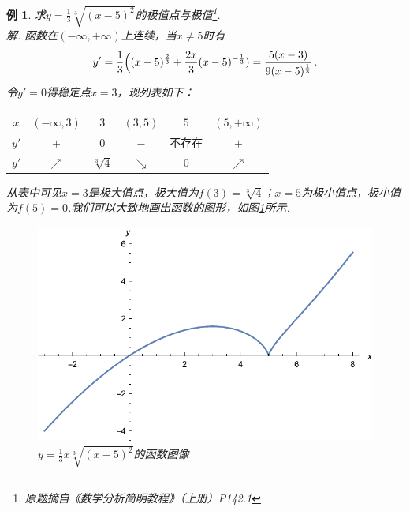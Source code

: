 \documentclass[UTF8,11pt]{ctexart}
\newtheorem{example}{例}
\begin{document}
		\begin{example}
			求$y=\frac{1}{3}\sqrt[3]{(x-5)^2}$的极值点与极值\footnote{原题摘自《数学分析简明教程》（上册）P142.1}.\\
			解. 函数在$(-\infty,+\infty)$上连续，当$x\not=5$时有
			\vspace{-4ex}
			\begin{equation}
			\vspace{-4ex}
				y'=\frac{1}{3}\Big((x-5)^\frac{2}{3} + \frac{2x}{3}(x-5)^{-\frac{1}{3}})=\frac{5(x-3)}{9(x-5)^\frac{1}{3}}\,.
			\end{equation}
			令$y'=0$得稳定点$x=3$，现列表如下：

			\begin{table}[H]
			\begin{center}
			\begin{tabular}{|c|c|c|c|c|c|}\hline
				$x$ & $(-\infty,3)$ & $3$ & $(3,5)$ & $5$ & $(5,+\infty)$\\\hline
				$y'$ & $+$ & $0$ & $-$ & $不存在$ & $+$\\\hline
				$y'$ & $\nearrow$ & $\sqrt[3]{4}$ & $\searrow$ & $0$ & $\nearrow$\\\hline
			\end{tabular}
			\end{center}
			\end{table}
			\vspace{-4ex}

			从表中可见$x=3$是极大值点，极大值为$f(3)=\sqrt[3]{4}$；$x=5$为极小值点，极小值为$f(5)=0$.我们可以大致地画出函数的图形，如图\ref{fig:function}所示.
			\begin{figure}[ht]
			\centering
			\includegraphics{function.pdf}
			\caption{\small\it $y=\frac{1}{3}x\sqrt[3]{(x-5)^2}$的函数图像}
			\label{fig:function}
			\end{figure}
		\end{example}
\end{document}
